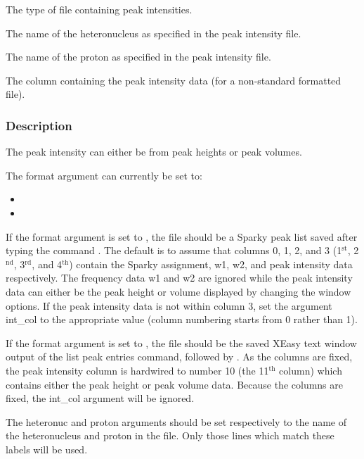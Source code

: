   The type of file containing peak intensities. 

  The name of the heteronucleus as specified in the peak intensity file. 

  The name of the proton as specified in the peak intensity file. 

  The column containing the peak intensity data (for a non-standard formatted file). 




\subsubsection{Description}

The peak intensity can either be from peak heights or peak volumes.


The format argument can currently be set to:


\begin{itemize}
\item[]  
\item[]  
\end{itemize}


If the format argument is set to , the file should be a Sparky peak list saved after typing the command .  The default is to assume that columns 0, 1, 2, and 3 (1$^\mathrm{st}$, 2$^\mathrm{nd}$, 3$^\mathrm{rd}$, and 4$^\mathrm{th}$) contain the Sparky assignment, w1, w2, and peak intensity data respectively. The frequency data w1 and w2 are ignored while the peak intensity data can either be the peak height or volume displayed by changing the window options.  If the peak intensity data is not within column 3, set the argument int\_col to the appropriate value (column numbering starts from 0 rather than 1).


If the format argument is set to , the file should be the saved XEasy text window output of the list peak entries command,  followed by .  As the columns are fixed, the peak intensity column is hardwired to number 10 (the 11$^\mathrm{th}$ column) which contains either the peak height or peak volume data.  Because the columns are fixed, the int\_col argument will be ignored.


The heteronuc and proton arguments should be set respectively to the name of the heteronucleus and proton in the file.  Only those lines which match these labels will be used.




